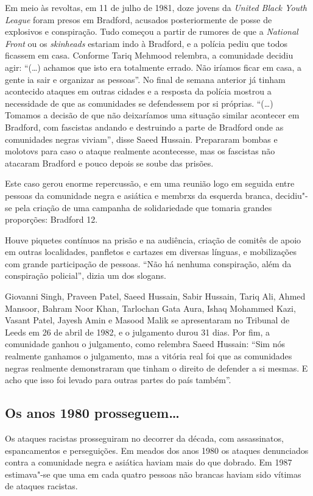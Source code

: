 Em meio às revoltas, em 11 de julho de 1981, doze jovens da \emph{United Black Youth League} foram presos em Bradford, acusados posteriormente de posse de explosivos e conspiração. Tudo começou a partir de rumores de que a \emph{National Front} ou os \emph{skinheads} estariam indo à Bradford, e a polícia pediu que todos ficassem em casa. Conforme Tariq Mehmood relembra, a comunidade decidiu agir: ``(\ldots{}) achamos que isto era totalmente errado. Não iríamos ficar em casa, a gente ia sair e organizar as pessoas''. No final de semana anterior já tinham acontecido ataques em outras cidades e a resposta da polícia mostrou a necessidade de que as comunidades se defendessem por si próprias. ``(\ldots{}) Tomamos a decisão de que não deixaríamos uma situação similar acontecer em Bradford, com fascistas andando e destruindo a parte de Bradford onde as comunidades negras viviam'', disse Saeed Hussain. Prepararam bombas e molotovs para caso o ataque realmente acontecesse, mas os fascistas não atacaram Bradford e pouco depois se soube das prisões.

Este caso gerou enorme repercussão, e em uma reunião logo em seguida entre pessoas da comunidade negra e asiática e membrxs da esquerda branca, decidiu"-se pela criação de uma campanha de solidariedade que tomaria grandes proporções: Bradford 12.

Houve piquetes contínuos na prisão e na audiência, criação de comitês de apoio em outras localidades, panfletos e cartazes em diversas línguas, e mobilizações com grande participação de pessoas. ``Não há nenhuma conspiração, além da conspiração policial'', dizia um dos slogans.

Giovanni Singh, Praveen Patel, Saeed Hussain, Sabir Hussain, Tariq Ali, Ahmed Mansoor, Bahram Noor Khan, Tarlochan Gata Aura, Ishaq Mohammed Kazi, Vasant Patel, Jayesh Amin e Masood Malik se apresentaram no Tribunal de Leeds em 26 de abril de 1982, e o julgamento durou 31 dias. Por fim, a comunidade ganhou o julgamento, como relembra Saeed Hussain: ``Sim nós realmente ganhamos o julgamento, mas a vitória real foi que as comunidades negras realmente demonstraram que tinham o direito de defender a si mesmas. E acho que isso foi levado para outras partes do país também''.


\subsection{Os anos 1980 prosseguem\ldots{}}

Os ataques racistas prosseguiram no decorrer da década, com assassinatos, espancamentos e perseguições. Em meados dos anos 1980 os ataques denunciados contra a comunidade negra e asiática haviam mais do que dobrado. Em 1987 estimava"-se que uma em cada quatro pessoas não brancas haviam sido vítimas de ataques racistas.

